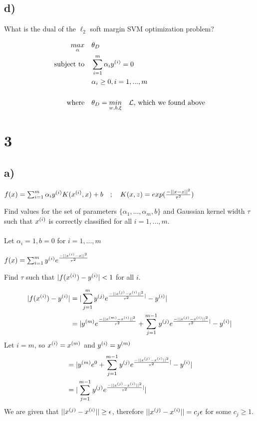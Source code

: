 \documentclass[11pt]{article}
\begin{document}
\subsection*{d)}

What is the dual of the $\ell_2$ soft margin SVM optimization problem?

\begin{align*}
  \underset{\alpha}{max} &\quad \theta_D \\
  \text{subject to}      &\quad \sum_{i=1}^{m} \alpha_i y^{(i)} = 0 \\
                         &\quad \alpha_i \geq 0, i=1,...,m \\
                         \\
  \text{where}           &\quad \theta_D = \underset{w,b,\xi}{min} \quad \mathcal{L} \text{, which we found above} \\
\end{align*}

\section*{3}

\subsection*{a)}

$f(x) = \sum_{i=1}^{m} \alpha_i y^{(i)} K(x^{(i)},x) + b  \quad ; \quad  K(x,z) = exp(\frac{-||x-z||^2}{\tau^2})$

Find values for the set of parameters $\{\alpha_1,...,\alpha_m,b\}$ and Gaussian kernel width $\tau$ such that $x^{(i)}$ is correctly classified for all $i = 1,...,m$. \\\\

Let $\alpha_i = 1, b = 0$ for $i = 1,...,m$

$f(x) = \sum_{i=1}^{m} y^{(i)} e^{\frac{-||x^{(i)} - x||^2}{\tau^2}}$

Find $\tau$ such that $|f(x^{(i)}) - y^{(i)}| < 1$ for all $i$.

\begin{align*}
    |f(x^{(i)}) - y^{(i)}| &= |\sum_{j=1}^{m} y^{(j)} e^{\frac{-||x^{(j)} - x^{(i)}||^2}{\tau^2}|} - y^{(i)}| \\
                       &= |y^{(m)}e^{\frac{-||x^{(m)} - x^{(i)}||^2}{\tau^2}} + \sum_{j=1}^{m-1} y^{(j)} e^{\frac{-||x^{(j)} - x^{(i)}||^2}{\tau^2}|} - y^{(i)}|
\end{align*}
Let $i = m$, so $x^{(i)} = x^{(m)}$ and $y^{(i)} = y^{(m)}$
\begin{align*}
    &= |y^{(m)}e^0 + \sum_{j=1}^{m-1} y^{(j)} e^{\frac{-||x^{(j)} - x^{(i)}||^2}{\tau^2}|} - y^{(i)}| \\
    &= |\sum_{j=1}^{m-1} y^{(j)} e^{\frac{-||x^{(j)} - x^{(i)}||^2}{\tau^2}|}| \\
\end{align*}
We are given that $||x^{(j)} - x^{(i)}|| \geq \epsilon$, therefore $||x^{(j)} - x^{(i)}|| = c_j \epsilon$ for some $c_j \geq 1$.
\end{document}
